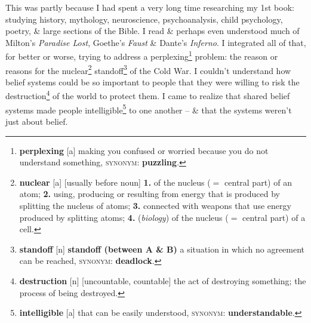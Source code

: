\documentclass[oneside]{book}
\numberwithin{equation}{section}
\begin{document}
This was partly because I had spent a very long time researching my 1st book: studying history, mythology, neuroscience, psychoanalysis, child psychology, poetry, \& large sections of the Bible. I read \& perhaps even understood much of Milton's \textit{Paradise Lost}, Goethe's \textit{Faust} \& Dante's \textit{Inferno}. I integrated all of that, for better or worse, trying to address a perplexing\footnote{\textbf{perplexing} [a] making you confused or worried because you do not understand something, \textsc{synonym}: \textbf{puzzling}.} problem: the reason or reasons for the nuclear\footnote{\textbf{nuclear} [a] [usually before noun] \textbf{1.} of the nucleus ($=$ central part) of an atom; \textbf{2.} using, producing or resulting from energy that is produced by splitting the nucleus of atoms; \textbf{3.} connected with weapons that use energy produced by splitting atoms; \textbf{4.} (\textit{biology}) of the nucleus ($=$ central part) of a cell.} standoff\footnote{\textbf{standoff} [n] \textbf{standoff (between A \& B)} a situation in which no agreement can be reached, \textsc{synonym}: \textbf{deadlock}.} of the Cold War. I couldn't understand how belief systems could be so important to people that they were willing to risk the destruction\footnote{\textbf{destruction} [n] [uncountable, countable] the act of destroying something; the process of being destroyed.} of the world to protect them. I came to realize that shared belief systems made people intelligible\footnote{\textbf{intelligible} [a] that can be easily understood, \textsc{synonym}: \textbf{understandable}.} to one another -- \& that the systems weren't just about belief.
\end{document}
